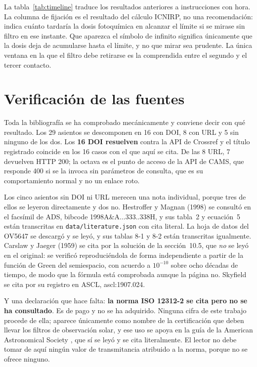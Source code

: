 \documentclass[10pt,a4paper]{article}
\begin{document}
La tabla~\ref{tab:timeline} traduce los resultados anteriores a instrucciones con
hora. La columna de fijación es el resultado del cálculo ICNIRP, no una
recomendación: indica cuánto tardaría la dosis fotoquímica en alcanzar el límite
si se mirase sin filtro en ese instante. Que aparezca el símbolo de infinito
significa únicamente que la dosis deja de acumularse hasta el límite, y no que
mirar sea prudente. La única ventana en la que el filtro debe retirarse es la
comprendida entre el segundo y el tercer contacto.



\section{Verificación de las fuentes}

Toda la bibliografía se ha comprobado mecánicamente y conviene decir con qué
resultado. Los 29 asientos se descomponen en 16 con DOI, 8 con URL y 5 sin
ninguno de los dos. Los \textbf{16 DOI resuelven} contra la API de Crossref y el
título registrado coincide en los 16 casos con el que aquí se cita. De las 8 URL,
7 devuelven HTTP 200; la octava es el punto de acceso de la API de CAMS, que
responde 400 si se la invoca sin parámetros de consulta, que es su comportamiento
normal y no un enlace roto.

Los cinco asientos sin DOI ni URL merecen una nota individual, porque tres de
ellos se leyeron directamente y dos no. Hestroffer y Magnan (1998) se consultó en
el facsímil de ADS, bibcode 1998A\&A...333..338H, y sus tabla~2 y ecuación~5 están
transcritas en \texttt{data/literature.json} con cita literal. La hoja de datos
del OV5647 se descargó y se leyó, y sus tablas 8-1 y 8-2 están transcritas
igualmente. Carslaw y Jaeger (1959) se cita por la solución de la sección~10.5,
que \emph{no} se leyó en el original: se verificó reproduciéndola de forma
independiente a partir de la función de Green del semiespacio, con acuerdo a
$10^{-10}$ sobre ocho décadas de tiempo, de modo que la fórmula está comprobada
aunque la página no. Skyfield se cita por su registro en ASCL, ascl:1907.024.

Y una declaración que hace falta: \textbf{la norma ISO 12312-2 se cita pero no se
ha consultado}. Es de pago y no se ha adquirido. Ninguna cifra de este trabajo
procede de ella; aparece únicamente como nombre de la certificación que deben
llevar los filtros de observación solar, y ese uso se apoya en la guía de la
American Astronomical Society \cite{aas}, que sí se leyó y se cita literalmente.
El lector no debe tomar de aquí ningún valor de transmitancia atribuido a la
norma, porque no se ofrece ninguno.
\end{document}
